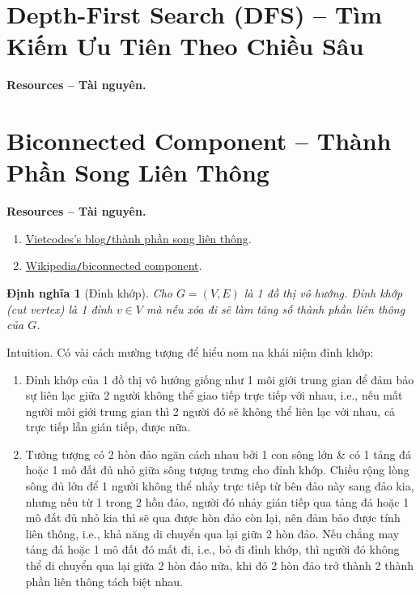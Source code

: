 \documentclass{article}
\newtheorem{dinhnghia}{Định nghĩa}
\begin{document}

\section{Depth-First Search (DFS) -- Tìm Kiếm Ưu Tiên Theo Chiều Sâu}
\textbf{\textsf{Resources -- Tài nguyên.}}



\section{Biconnected Component -- Thành Phần Song Liên Thông}
\textbf{\textsf{Resources -- Tài nguyên.}}
\begin{enumerate}
    \item \href{https://blog.vietcodes.com/algo/biconnect}{Vietcodes's blog{\tt/}thành phần song liên thông}.

    \item \href{https://en.wikipedia.org/wiki/Biconnected_component}{Wikipedia{\tt/}biconnected component}.
\end{enumerate}

\begin{dinhnghia}[Đỉnh khớp]
    Cho $G = (V,E)$ là 1 đồ thị vô hướng. {\rm Đỉnh khớp (cut vertex)} là 1 đỉnh $v\in V$ mà nếu xóa đi sẽ làm tăng số thành phần liên thông của $G$.
\end{dinhnghia}
{\sf Intuition.} Có vài cách mường tượng để hiểu nom na khái niệm đỉnh khớp:
\begin{enumerate}
    \item Đỉnh khớp của 1 đồ thị vô hướng giống như 1 môi giới trung gian để đảm bảo sự liên lạc giữa 2 người không thể giao tiếp trực tiếp với nhau, i.e., nếu mất người môi giới trung gian thì 2 người đó sẽ không thể liên lạc với nhau, cả trực tiếp lẫn gián tiếp, được nữa.

    \item Tưởng tượng có 2 hòn đảo ngăn cách nhau bởi 1 con sông lớn \& có 1 tảng đá hoặc 1 mô đất đủ nhỏ giữa sông tượng trưng cho đỉnh khớp. Chiều rộng lòng sông đủ lớn để 1 người không thể nhảy trực tiếp từ bên đảo này sang đảo kia, nhưng nếu từ 1 trong 2 hồn đảo, người đó nhảy gián tiếp qua tảng đá hoặc 1 mô đất đủ nhỏ kia thì sẽ qua được hòn đảo còn lại, nên đảm bảo được tính liên thông, i.e., khả năng di chuyển qua lại giữa 2 hòn đảo. Nếu chẳng may tảng đá hoặc 1 mô đất đó mất đi, i.e., bỏ đi đỉnh khớp, thì người đó không thể di chuyển qua lại giữa 2 hòn đảo nữa, khi đó 2 hòn đảo trở thành 2 thành phần liên thông tách biệt nhau.
\end{enumerate}
\end{document}
